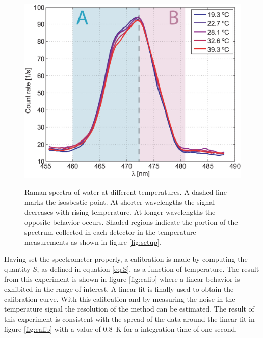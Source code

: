 \documentclass[twocolumn]{svjour3}       %
\begin{document}
\begin{figure}[h!]
\centering
\includegraphics[width=\columnwidth]{figs/spectra.eps}
\label{fig:spectra}
\caption{Raman spectra of water at different temperatures. A dashed line marks the isosbestic point. At shorter wavelengths the signal decreases with rising temperature. At longer wavelengths the opposite behavior occurs. Shaded regions indicate the portion of the spectrum collected in each detector in the temperature measurements as shown in figure \ref{fig:setup}.}
\end{figure}

Having set the spectrometer properly, a calibration is made by computing the quantity $S$, as defined in equation \ref{eq:S}, as a function of temperature. The result from this experiment is shown in figure \ref{fig:calib} where a linear behavior is exhibited in the range of interest. A linear fit is finally used to obtain the calibration curve. With this calibration and by measuring the noise in the temperature signal  the resolution of the method can be estimated. The result of this experiment is consistent with the spread of the data around the linear fit in figure \ref{fig:calib} with a value of 0.8~K for a integration time of one second.
\end{document}
